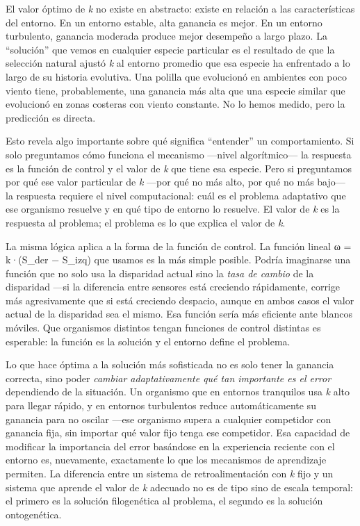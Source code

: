 \documentclass[
  letterpaper,
  DIV=11,
  numbers=noendperiod]{scrreprt}
\begin{document}
\begin{tcolorbox}[enhanced jigsaw, arc=.35mm, bottomrule=.15mm, breakable, colback=white, colframe=quarto-callout-note-color-frame, left=2mm, leftrule=.75mm, opacityback=0, rightrule=.15mm, toprule=.15mm]
El valor óptimo de \emph{k} no existe en abstracto: existe en relación a
las características del entorno. En un entorno estable, alta ganancia es
mejor. En un entorno turbulento, ganancia moderada produce mejor
desempeño a largo plazo. La ``solución'' que vemos en cualquier especie
particular es el resultado de que la selección natural ajustó \emph{k}
al entorno promedio que esa especie ha enfrentado a lo largo de su
historia evolutiva. Una polilla que evolucionó en ambientes con poco
viento tiene, probablemente, una ganancia más alta que una especie
similar que evolucionó en zonas costeras con viento constante. No lo
hemos medido, pero la predicción es directa.

Esto revela algo importante sobre qué significa ``entender'' un
comportamiento. Si solo preguntamos cómo funciona el mecanismo ---nivel
algorítmico--- la respuesta es la función de control y el valor de
\emph{k} que tiene esa especie. Pero si preguntamos por qué ese valor
particular de \emph{k} ---por qué no más alto, por qué no más bajo--- la
respuesta requiere el nivel computacional: cuál es el problema
adaptativo que ese organismo resuelve y en qué tipo de entorno lo
resuelve. El valor de \emph{k} es la respuesta al problema; el problema
es lo que explica el valor de \emph{k}.

La misma lógica aplica a la forma de la función de control. La función
lineal ω = k·(S\_der − S\_izq) que usamos es la más simple posible.
Podría imaginarse una función que no solo usa la disparidad actual sino
la \emph{tasa de cambio} de la disparidad ---si la diferencia entre
sensores está creciendo rápidamente, corrige más agresivamente que si
está creciendo despacio, aunque en ambos casos el valor actual de la
disparidad sea el mismo. Esa función sería más eficiente ante blancos
móviles. Que organismos distintos tengan funciones de control distintas
es esperable: la función es la solución y el entorno define el problema.

Lo que hace óptima a la solución más sofisticada no es solo tener la
ganancia correcta, sino poder \emph{cambiar adaptativamente qué tan
importante es el error} dependiendo de la situación. Un organismo que en
entornos tranquilos usa \emph{k} alto para llegar rápido, y en entornos
turbulentos reduce automáticamente su ganancia para no oscilar ---ese
organismo supera a cualquier competidor con ganancia fija, sin importar
qué valor fijo tenga ese competidor. Esa capacidad de modificar la
importancia del error basándose en la experiencia reciente con el
entorno es, nuevamente, exactamente lo que los mecanismos de aprendizaje
permiten. La diferencia entre un sistema de retroalimentación con
\emph{k} fijo y un sistema que aprende el valor de \emph{k} adecuado no
es de tipo sino de escala temporal: el primero es la solución
filogenética al problema, el segundo es la solución ontogenética.


\end{tcolorbox}
\end{document}

